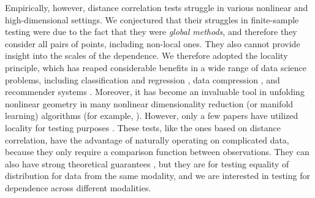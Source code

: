 \documentclass[11pt]{article}
\begin{document}
Empirically, however, distance correlation tests struggle in various nonlinear and high-dimensional settings. We conjectured that their struggles in finite-sample testing were due to the fact that they were \emph{global methods}, and therefore they consider all pairs of points, including non-local ones. They also cannot provide insight into the scales of the dependence. We therefore adopted the locality principle, which has reaped considerable benefits in a wide range of data science problems, including  classification and regression  \cite{Stone1977}, data compression \cite{DaubechiesWaveletBook}, and recommender systems \cite{Sarwar2000}.
Moreover, it has become an invaluable tool in unfolding nonlinear geometry in many nonlinear dimensionality reduction (or manifold learning) algorithms (for example, \cite{
TorgersonBook, 
TenenbaumSilvaLangford2000, 
SaulRoweis2000, 
BelkinNiyogi2003,
DiffusionPNAS,
MMS:NoisyDictionaryLearning}). 
However, only a few papers have utilized locality for testing purposes \cite{David1966,Friedman1983,Schilling1986}.  These tests, like the ones based on distance correlation, have the advantage of naturally operating on complicated data, because they only require a comparison function between observations.  They can also have strong theoretical guarantees \cite{Maa1996}, but they are for testing equality of distribution for data from the same modality, and we are interested in testing for dependence across different modalities. 
\end{document}

